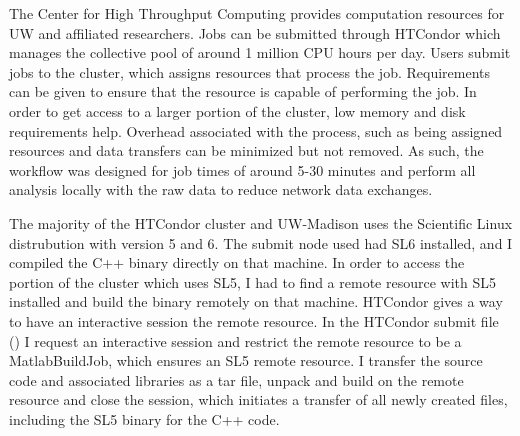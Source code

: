 The Center for High Throughput Computing provides computation resources for UW and affiliated researchers.  Jobs can be submitted through HTCondor \cite{beowulfbook-condor} which manages the collective pool of around 1 million CPU hours per day.  Users submit jobs to the cluster, which assigns resources that process the job.  Requirements can be given to ensure that the resource is capable of performing the job.  In order to get access to a larger portion of the cluster, low memory and disk requirements help.  Overhead associated with the process, such as being assigned resources and data transfers can be minimized but not removed. As such, the workflow was designed for job times of around 5-30 minutes and perform all analysis locally with the raw data to reduce network data exchanges.

The majority of the HTCondor cluster and UW-Madison uses the Scientific Linux distrubution with version 5 and 6.  The submit node used had SL6 installed, and I compiled the C++ binary directly on that machine.  In order to access the portion of the cluster which uses SL5, I had to find a remote resource with SL5 installed and build the binary remotely on that machine.  HTCondor gives a way to have an interactive session the remote resource.  In the HTCondor submit file () I request an interactive session and restrict the remote resource to be a MatlabBuildJob, which ensures an SL5 remote resource.  I transfer the source code and associated libraries as a tar file, unpack and build on the remote resource and close the session, which initiates a transfer of all newly created files, including the SL5 binary for the C++ code.

\linespread{1}
\linespread{2}


